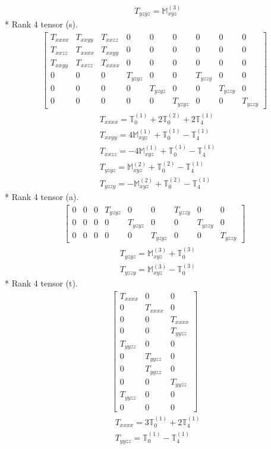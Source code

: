 \documentclass[fleqn,8pt,landscape]{jsarticle}
\begin{document}
\begin{align*}
& T_{yzyz} = \mathbb{M}_{xyz}^{(3)}
\end{align*}
* Rank 4 tensor (s).
\begin{align*}
\begin{bmatrix} T_{xxxx} & T_{xxyy} & T_{xxzz} & 0 & 0 & 0 & 0 & 0 & 0 \\ T_{xxzz} & T_{xxxx} & T_{xxyy} & 0 & 0 & 0 & 0 & 0 & 0 \\ T_{xxyy} & T_{xxzz} & T_{xxxx} & 0 & 0 & 0 & 0 & 0 & 0 \\ 0 & 0 & 0 & T_{yzyz} & 0 & 0 & T_{yzzy} & 0 & 0 \\ 0 & 0 & 0 & 0 & T_{yzyz} & 0 & 0 & T_{yzzy} & 0 \\ 0 & 0 & 0 & 0 & 0 & T_{yzyz} & 0 & 0 & T_{yzzy} \end{bmatrix}
\end{align*}
\begin{align*}
& T_{xxxx} = \mathbb{T}_{0}^{(1)} + 2 \mathbb{T}_{0}^{(2)} + 2 \mathbb{T}_{4}^{(1)} \\
& T_{xxyy} = 4 \mathbb{M}_{xyz}^{(1)} + \mathbb{T}_{0}^{(1)} - \mathbb{T}_{4}^{(1)} \\
& T_{xxzz} = - 4 \mathbb{M}_{xyz}^{(1)} + \mathbb{T}_{0}^{(1)} - \mathbb{T}_{4}^{(1)} \\
& T_{yzyz} = \mathbb{M}_{xyz}^{(2)} + \mathbb{T}_{0}^{(2)} - \mathbb{T}_{4}^{(1)} \\
& T_{yzzy} = - \mathbb{M}_{xyz}^{(2)} + \mathbb{T}_{0}^{(2)} - \mathbb{T}_{4}^{(1)}
\end{align*}
* Rank 4 tensor (a).
\begin{align*}
\begin{bmatrix} 0 & 0 & 0 & T_{yzyz} & 0 & 0 & T_{yzzy} & 0 & 0 \\ 0 & 0 & 0 & 0 & T_{yzyz} & 0 & 0 & T_{yzzy} & 0 \\ 0 & 0 & 0 & 0 & 0 & T_{yzyz} & 0 & 0 & T_{yzzy} \end{bmatrix}
\end{align*}
\begin{align*}
& T_{yzyz} = \mathbb{M}_{xyz}^{(3)} + \mathbb{T}_{0}^{(3)} \\
& T_{yzzy} = \mathbb{M}_{xyz}^{(3)} - \mathbb{T}_{0}^{(3)}
\end{align*}
* Rank 4 tensor (t).
\begin{align*}
\begin{bmatrix} T_{xxxx} & 0 & 0 \\ 0 & T_{xxxx} & 0 \\ 0 & 0 & T_{xxxx} \\ 0 & 0 & T_{yyzz} \\ T_{yyzz} & 0 & 0 \\ 0 & T_{yyzz} & 0 \\ 0 & T_{yyzz} & 0 \\ 0 & 0 & T_{yyzz} \\ T_{yyzz} & 0 & 0 \\ 0 & 0 & 0 \end{bmatrix}
\end{align*}
\begin{align*}
& T_{xxxx} = 3 \mathbb{T}_{0}^{(1)} + 2 \mathbb{T}_{4}^{(1)} \\
& T_{yyzz} = \mathbb{T}_{0}^{(1)} - \mathbb{T}_{4}^{(1)}
\end{align*}
\end{document}
